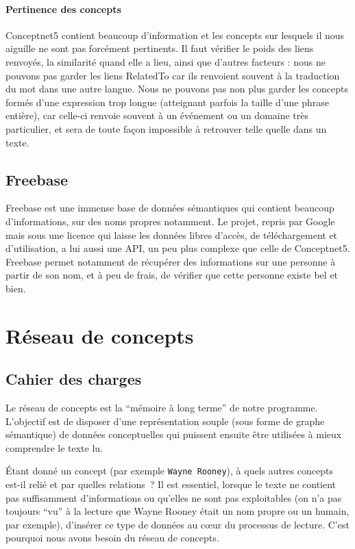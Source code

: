 \documentclass[a4paper, 12pt]{article}
\begin{document}
\paragraph{Pertinence des concepts}
Conceptnet5 contient beaucoup d'information et les concepts sur lesquels il nous aiguille ne sont pas forcément pertinents. Il faut vérifier le poids des liens renvoyés, la similarité quand elle a lieu, ainsi que d'autres facteurs : nous ne pouvons pas garder les liens RelatedTo car ils renvoient souvent à la traduction du mot dans une autre langue. Nous ne pouvons pas non plus garder les concepts formés d'une expression trop longue (atteignant parfois la taille d'une phrase entière), car celle-ci renvoie souvent à un événement ou un domaine très particulier, et sera de toute façon impossible à retrouver telle quelle dans un texte.


\subsection{Freebase}

Freebase est une immense base de données sémantiques qui contient beaucoup d'informations, sur des noms propres notamment. Le projet, repris par Google mais sous une licence qui laisse les données libres d'accès, de téléchargement et d'utilisation, a lui aussi une API, un peu plus complexe que celle de Conceptnet5. Freebase permet notamment de récupérer des informations sur une personne à partir de son nom, et à peu de frais, de vérifier que cette personne existe bel et bien.


\section{Réseau de concepts}

\subsection{Cahier des charges}

Le réseau de concepts est la ``mémoire à long terme'' de notre programme. L'objectif est de disposer d'une représentation souple (sous forme de graphe sémantique) de données conceptuelles qui puissent ensuite être utilisées à mieux comprendre le texte lu.

Étant donné un concept (par exemple \verb|Wayne Rooney|), à quels autres concepts est-il relié et par quelles relations~? Il est essentiel, lorsque le texte ne contient pas suffisamment d'informations ou qu'elles ne sont pas exploitables (on n'a pas toujours ``vu'' à la lecture que Wayne Rooney était un nom propre ou un humain, par exemple), d'insérer ce type de données au cœur du processus de lecture. C'est pourquoi nous avons besoin du réseau de concepts.
\end{document}
